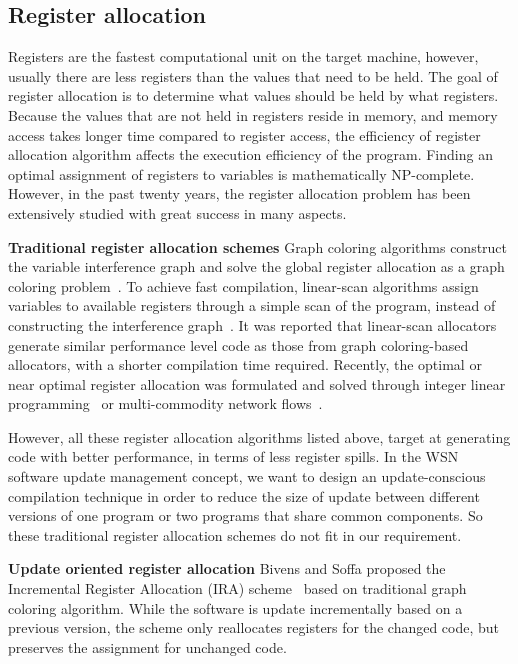 \subsection{Register allocation}

Registers are the fastest computational unit on the target machine, however, usually there are less registers than the values that need to be held. The goal of register allocation is to determine what values should be held by what registers. Because the values that are not held in registers reside in memory, and memory access takes longer time compared to register access, the efficiency of register allocation algorithm affects the execution efficiency of the program. 
Finding an optimal assignment of registers to variables is mathematically NP-complete. However, in the past twenty years, the register allocation problem has been extensively studied with great success in many aspects. 

\textbf{Traditional register allocation schemes} Graph coloring algorithms construct the variable interference graph and solve the global register allocation as a graph coloring problem~\cite{related:graph-color,related:graph-color-improvements,related:graph-color-iterated,related:graph-color-priority}. To achieve fast compilation, linear-scan algorithms assign variables to available registers through a simple scan of the program, instead of constructing the interference graph~\cite{related:linear-scan,related:linear-scan-fast}. It was reported that linear-scan allocators generate similar performance level code as those from graph coloring-based allocators, with a shorter compilation time required. Recently, the optimal or near optimal register allocation was formulated and solved through integer linear programming~\cite{related:ilp,related:ilp-cisc,related:ilp-fast} or multi-commodity network flows~\cite{related:ilp-progressive}.

However, all these register allocation algorithms listed above, target at generating code with better performance, in terms of less register spills. In the WSN software update management concept, we want to design an update-conscious compilation technique in order to reduce the size of update between different versions of one program or two programs that share common components. So these traditional register allocation schemes do not fit in our requirement.

\textbf{Update oriented register allocation}
Bivens and Soffa proposed the Incremental Register Allocation (IRA) scheme~\cite{related:ira} based on traditional graph coloring algorithm. While the software is update incrementally based on a previous version, the scheme only reallocates registers for the changed code, but preserves the assignment for unchanged code. 


